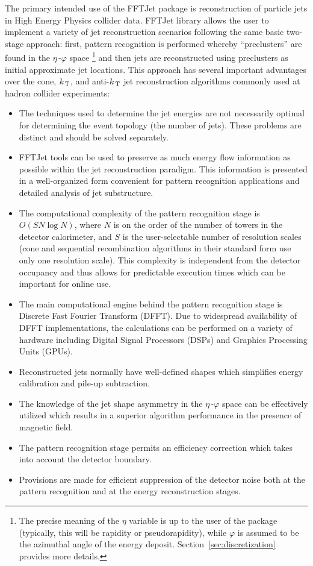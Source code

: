 \documentclass[epsf,12pt,titlepage]{article}
\newcommand{\sub}[1]{\ensuremath{_{\mbox{\scriptsize \,#1}}}}
\def\KT {\mbox{$k\sub{T}$} }
\def\epspace {$\eta$\,-$\varphi$ space }
\begin{document}
The primary intended use of the FFTJet package is reconstruction of
particle jets in High Energy Physics collider data. FFTJet library allows the
user to implement a variety of jet reconstruction scenarios following
the same basic two-stage approach: first, pattern recognition is
performed whereby ``preclusters'' are found in the
      \epspace$\!\!$\footnote{The precise
      meaning of the $\eta$ variable
      is up to the user of the package
      (typically, this will be rapidity or pseudorapidity), while $\varphi$ is assumed
      to be the azimuthal angle of
      the energy deposit. Section~\ref{sec:discretization}
      provides more details.}
and then jets are reconstructed using preclusters as initial approximate
jet locations. This approach has several
important advantages over the cone, {\mbox{$k\sub{T}$}}, and anti-\KT jet reconstruction
algorithms commonly used at hadron collider experiments:
\begin{itemize}
\item The techniques used to determine the jet energies are not necessarily
      optimal for determining the event topology (the number of jets).
      These problems are distinct and should be solved separately.
\item FFTJet tools can be used to preserve as much
      energy flow information as possible within the jet reconstruction
      paradigm. This information is presented in a well-organized
      form convenient for pattern recognition applications and detailed
      analysis of jet substructure.
\item The computational complexity of the pattern recognition stage is
      $O(S N \log N)$, where $N$ is on the order of the number of towers
      in the detector calorimeter, and $S$ is the user-selectable
      number of resolution scales (cone and sequential recombination
      algorithms in their standard form use only
      one resolution scale). This complexity is independent from the
      detector occupancy and thus allows for predictable execution
      times which can be important for online use.
\item The main computational engine behind the pattern recognition
      stage is Discrete Fast Fourier Transform (DFFT). Due to widespread
      availability of DFFT implementations, the
      calculations can be performed on a variety of hardware including
      Digital Signal Processors (DSPs) and Graphics Processing Units (GPUs).
\item Reconstructed jets normally have well-defined shapes which simplifies
      energy calibration and pile-up subtraction.
\item The knowledge of the jet shape asymmetry in the \epspace can
      be effectively utilized which results in a superior algorithm
      performance in the presence of magnetic field.
\item The pattern recognition stage permits an efficiency
      correction which takes into account the detector boundary.
\item Provisions are made for efficient suppression of the detector noise
      both at
      the pattern recognition and at the energy reconstruction stages.
\end{itemize}
\end{document}
